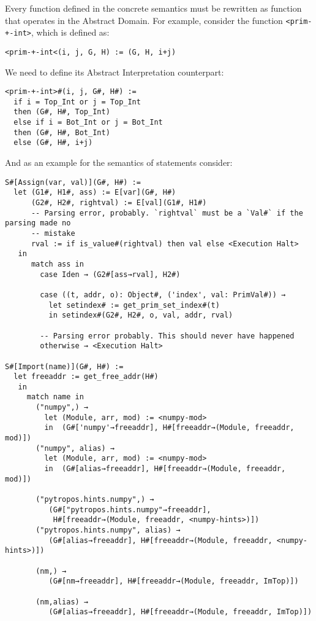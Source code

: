 Every function defined in the concrete semantics must be rewritten as function that
operates in the Abstract Domain. For example, consider the function \verb|<prim-+-int>|,
which is defined as:

\verb|<prim-+-int<(i, j, G, H) := (G, H, i+j)|

We need to define its Abstract Interpretation counterpart:

\begin{verbatim}
<prim-+-int>#(i, j, G#, H#) :=
  if i = Top_Int or j = Top_Int
  then (G#, H#, Top_Int)
  else if i = Bot_Int or j = Bot_Int
  then (G#, H#, Bot_Int)
  else (G#, H#, i+j)
\end{verbatim}

And as an example for the semantics of statements consider:

\begin{verbatim}
S#[Assign(var, val)](G#, H#) :=
  let (G1#, H1#, ass) := E[var](G#, H#)
      (G2#, H2#, rightval) := E[val](G1#, H1#)
      -- Parsing error, probably. `rightval` must be a `Val#` if the parsing made no
      -- mistake
      rval := if is_value#(rightval) then val else <Execution Halt>
   in
      match ass in
        case Iden → (G2#[ass→rval], H2#)

        case ((t, addr, o): Object#, ('index', val: PrimVal#)) →
          let setindex# := get_prim_set_index#(t)
          in setindex#(G2#, H2#, o, val, addr, rval)

        -- Parsing error probably. This should never have happened
        otherwise → <Execution Halt>

S#[Import(name)](G#, H#) :=
  let freeaddr := get_free_addr(H#)
   in
     match name in
       ("numpy",) →
         let (Module, arr, mod) := <numpy-mod>
         in  (G#['numpy'→freeaddr], H#[freeaddr→(Module, freeaddr, mod)])
       ("numpy", alias) →
         let (Module, arr, mod) := <numpy-mod>
         in  (G#[alias→freeaddr], H#[freeaddr→(Module, freeaddr, mod)])

       ("pytropos.hints.numpy",) →
          (G#["pytropos.hints.numpy"→freeaddr],
           H#[freeaddr→(Module, freeaddr, <numpy-hints>)])
       ("pytropos.hints.numpy", alias) →
          (G#[alias→freeaddr], H#[freeaddr→(Module, freeaddr, <numpy-hints>)])

       (nm,) →
          (G#[nm→freeaddr], H#[freeaddr→(Module, freeaddr, ImTop)])

       (nm,alias) →
          (G#[alias→freeaddr], H#[freeaddr→(Module, freeaddr, ImTop)])


\end{verbatim}
